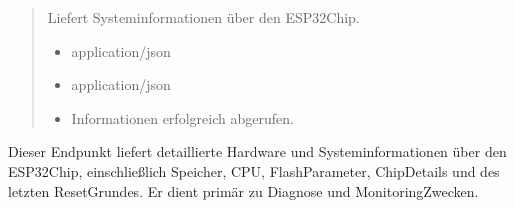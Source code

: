 \documentclass[letterpaper,10pt,english]{sphinxmanual}
\begin{document}
\begin{fulllineitems}
\label{\detokenize{agv_rest_api_info:get--api-info-esp32-chip}}
\pysigstartsignatures
\pysigline
{}
\pysigstopsignatures\begin{quote}\begin{description}
\sphinxAtStartPar
Liefert Systeminformationen über den ESP32\sphinxhyphen{}Chip.

\begin{itemize}
\item {} 
\sphinxAtStartPar
{} \textendash{} application/json

\end{itemize}

\begin{itemize}
\item {} 
\sphinxAtStartPar
{} \textendash{} application/json

\end{itemize}

\begin{itemize}
\item {} 
\sphinxAtStartPar
{} \textendash{} Informationen erfolgreich abgerufen.

\end{itemize}

\end{description}\end{quote}

\end{fulllineitems}


\sphinxAtStartPar
{}
Dieser Endpunkt liefert detaillierte Hardware\sphinxhyphen{} und Systeminformationen über den ESP32\sphinxhyphen{}Chip,
einschließlich Speicher, CPU, Flash\sphinxhyphen{}Parameter, Chip\sphinxhyphen{}Details und des letzten Reset\sphinxhyphen{}Grundes.
Er dient primär zu Diagnose\sphinxhyphen{} und Monitoring\sphinxhyphen{}Zwecken.

\sphinxAtStartPar
{}
\end{document}

